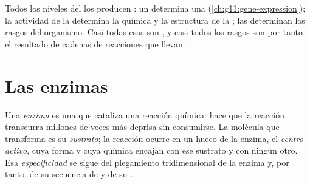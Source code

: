 \begin{proposition}\label{prop:g11:enzymes-and-phenotype:proteins}
Todos los niveles del  los producen : un 
determina una  (\cref{ch:g11:gene-expression}); la actividad de
la  determina la química y la estructura de la ; las
 determinan los rasgos del organismo. Casi todas esas 
son \emph{}, y casi todos los rasgos son por tanto el resultado
de cadenas de reacciones que llevan .
\end{proposition}
\admitted

\section{Las enzimas}

\begin{definition}\label{def:g11:enzymes-and-phenotype:enzyme}
Una \emph{enzima} es una  que cataliza una
reacción química: hace que la reacción transcurra millones de veces más
deprisa sin consumirse. La molécula que transforma es su
\emph{sustrato}; la reacción ocurre en un hueco de la
enzima, el \emph{centro activo}, cuya forma y cuya
química encajan con ese sustrato y con ningún otro. Esa
\emph{especificidad} se sigue del plegamiento tridimensional de la
enzima y, por tanto, de su secuencia de  y de su .
\end{definition}


